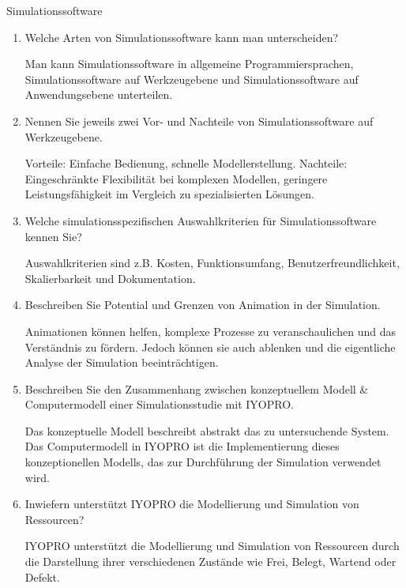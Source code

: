 \documentclass{article}
\begin{document}
\begin{exercise}{Simulationssoftware}
  \begin{enumerate}
    \item Welche Arten von Simulationssoftware kann man unterscheiden?
          \begin{solution}
            Man kann Simulationssoftware in allgemeine Programmiersprachen, Simulationssoftware auf Werkzeugebene und Simulationssoftware auf Anwendungsebene unterteilen.
          \end{solution}

    \item Nennen Sie jeweils zwei Vor- und Nachteile von Simulationssoftware auf Werkzeugebene.
          \begin{solution}
            Vorteile: Einfache Bedienung, schnelle Modellerstellung. Nachteile: Eingeschränkte Flexibilität bei komplexen Modellen, geringere Leistungsfähigkeit im Vergleich zu spezialisierten Lösungen.
          \end{solution}

    \item Welche simulationsspezifischen Auswahlkriterien für Simulationssoftware kennen Sie?
          \begin{solution}
            Auswahlkriterien sind z.B. Kosten, Funktionsumfang, Benutzerfreundlichkeit, Skalierbarkeit und Dokumentation.
          \end{solution}

    \item Beschreiben Sie Potential und Grenzen von Animation in der Simulation.
          \begin{solution}
            Animationen können helfen, komplexe Prozesse zu veranschaulichen und das Verständnis zu fördern. Jedoch können sie auch ablenken und die eigentliche Analyse der Simulation beeinträchtigen.
          \end{solution}

    \item Beschreiben Sie den Zusammenhang zwischen konzeptuellem Modell \& Computermodell einer Simulationsstudie mit IYOPRO.
          \begin{solution}
            Das konzeptuelle Modell beschreibt abstrakt das zu untersuchende System. Das Computermodell in IYOPRO ist die Implementierung dieses konzeptionellen Modells, das zur Durchführung der Simulation verwendet wird.
          \end{solution}

    \item Inwiefern unterstützt IYOPRO die Modellierung und Simulation von Ressourcen?
          \begin{solution}
            IYOPRO unterstützt die Modellierung und Simulation von Ressourcen durch die Darstellung ihrer verschiedenen Zustände wie Frei, Belegt, Wartend oder Defekt.
          \end{solution}


\end{enumerate}
\end{exercise}
\end{document}
